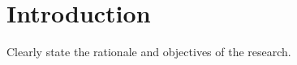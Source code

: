 \chapter*{\rm\bfseries Introduction}
\label{ch:introduction}

\mcgillguidelines Clearly state the rationale and objectives of the research.

